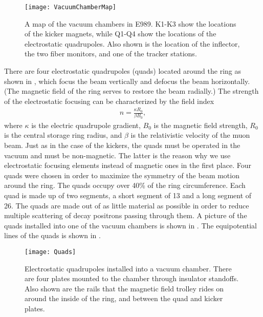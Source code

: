 \begin{figure}[]
    \centering
    \texttt{[image: VacuumChamberMap]}
    \caption[Vacuum chamber map]{A map of the vacuum chambers in E989. K1-K3 show the locations of the kicker magnets, while Q1-Q4 show the locations of the electrostatic quadrupoles. Also shown is the location of the inflector, the two fiber monitors, and one of the tracker stations.}   
    \label{fig:vacmap}
\end{figure}

There are four electrostatic quadrupoles (quads) located around the ring as shown in , which focus the beam vertically and defocus the beam horizontally. (The magnetic field of the ring serves to restore the beam radially.) The strength of the electrostatic focusing can be characterized by the field index
        \begin{align} \label{eq:fieldindex}
            n = \frac{\kappa R_{0}}{\beta B_{0}},
        \end{align}
where $\kappa$ is the electric quadrupole gradient, $B_{0}$ is the magnetic field strength, $R_{0}$ is the central storage ring radius, and $\beta$ is the relativistic velocity of the muon beam. Just as in the case of the kickers, the quads must be operated in the vacuum and must be non-magnetic. The latter is the reason why we use electrostatic focusing elements instead of magnetic ones in the first place. Four quads were chosen in order to maximize the symmetry of the beam motion around the ring. The quads occupy over 40\% of the ring circumference. Each quad is made up of two segments, a short segment of 13\textdegree{} and a long segment of 26\textdegree{}. The quads are made out of as little material as possible in order to reduce multiple scattering of decay positrons passing through them. A picture of the quads installed into one of the vacuum chambers is shown in . The equipotential lines of the quads is shown in . 

\begin{figure}[]
    \centering
    \texttt{[image: Quads]}
    \caption[Electrostatic quadrupoles installed in a vacuum chamber]{Electrostatic quadrupoles installed into a vacuum chamber. There are four plates mounted to the chamber through insulator standoffs. Also shown are the rails that the magnetic field trolley rides on around the inside of the ring, and between the quad and kicker plates.}   
    \label{fig:Quads}
\end{figure}

